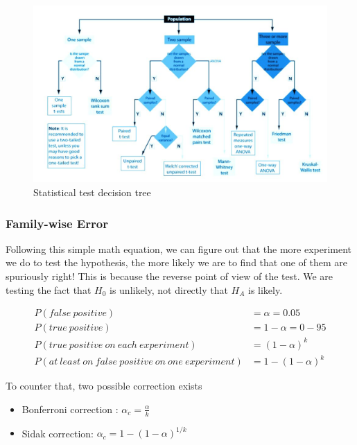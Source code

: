 \begin{figure}[h]%
 \centering
 \includegraphics[width=15cm]{./img/05/choose_test}
 \caption{\label{pic:testtree} Statistical test decision tree}
\end{figure}


\subsubsection{Family-wise Error}

Following this simple math equation, we can figure out that the more experiment we do to test the hypothesis, the more likely we are to find that one of them are spuriously right! This is because the reverse point of view of the test. We are testing the fact that $H_0$ is unlikely, not directly that $H_A$ is likely. 

\begin{equation} \label{eq1}
\begin{split}
P(false \: positive) &= \alpha = 0.05 \\ 
P(true \: positive) &= 1 - \alpha = 0-95 \\
P(true \: positive \: on \: each \: experiment) &= (1 - \alpha)^k \\
P(at \: least \: on \: false \: positive \: on \: one \: experiment) &= 1 - (1 - \alpha)^k
\end{split}
\end{equation}

To counter that, two possible correction exists
\begin{itemize}
  \item Bonferroni correction : $\alpha_c = \frac{\alpha}{k}$ 
  \item Sidak correction: $\alpha_c = 1- (1 - \alpha)^{1/k} $
\end{itemize}



